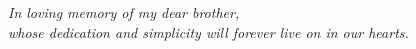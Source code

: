 \cleardoublepage\newpage\thispagestyle{empty}\null
\cleardoublepage\newpage
\thispagestyle{empty}
\begin{center}
\Large\itshape
In loving memory of my dear brother,\\ 
whose dedication and simplicity will forever live on in our hearts.
\end{center}
